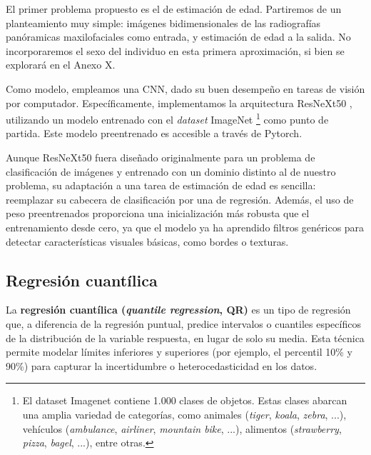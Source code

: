 El primer problema propuesto es el de estimación de edad. Partiremos de un planteamiento muy simple: imágenes 
bidimensionales de las radiografías panóramicas maxilofaciales como entrada, y estimación de edad a la salida.
No incorporaremos el sexo del individuo en esta primera aproximación, si bien se explorará en el Anexo X. 

Como modelo, empleamos una CNN, dado su buen desempeño en tareas de visión por computador. Específicamente,
implementamos la arquitectura ResNeXt50 \cite{xie2017}, utilizando un modelo entrenado con el \textit{dataset} 
ImageNet
\footnote{
    El dataset Imagenet contiene 1.000 clases de objetos. Estas clases abarcan una
    amplia variedad de categorías, como animales (\textit{tiger}, \textit{koala}, \textit{zebra}, ...), 
    vehículos (\textit{ambulance}, \textit{airliner}, \textit{mountain bike}, ...), alimentos 
    (\textit{strawberry}, \textit{pizza}, \textit{bagel}, ...), entre otras. 
}
\cite{deng2009} como punto de partida. Este modelo preentrenado es accesible a través de Pytorch. 

Aunque ResNeXt50 fuera diseñado originalmente para un problema de clasificación de imágenes y entrenado con
un dominio distinto al de nuestro problema, su adaptación a una tarea de estimación de edad es sencilla: 
reemplazar su cabecera de clasificación por una de regresión. Además, el uso de peso preentrenados proporciona
una inicialización más robusta que el entrenamiento desde cero, ya que el modelo ya ha aprendido filtros 
genéricos para detectar características visuales básicas, como bordes o texturas.


\subsection{Regresión cuantílica}

La \textbf{regresión cuantílica (\textit{quantile regression}, QR)} es un tipo de regresión que, a diferencia
de la regresión puntual, predice intervalos o cuantiles específicos de la distribución de la variable 
respuesta, en lugar de solo su media. 
Esta técnica permite modelar límites inferiores y superiores (por ejemplo, el percentil 10\% y 90\%) para
capturar la incertidumbre o heterocedasticidad en los datos.

